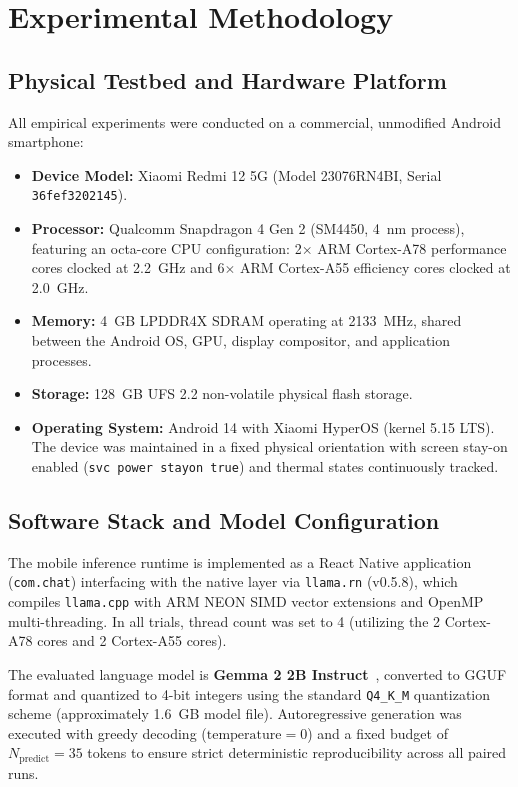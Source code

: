 \section{Experimental Methodology}
\label{sec:methodology}

\subsection{Physical Testbed and Hardware Platform}
All empirical experiments were conducted on a commercial, unmodified Android smartphone:
\begin{itemize}
    \item \textbf{Device Model:} Xiaomi Redmi 12 5G (Model 23076RN4BI, Serial \texttt{36fef3202145}).
    \item \textbf{Processor:} Qualcomm Snapdragon 4 Gen 2 (SM4450, 4~nm process), featuring an octa-core CPU configuration: 2$\times$ ARM Cortex-A78 performance cores clocked at 2.2~GHz and 6$\times$ ARM Cortex-A55 efficiency cores clocked at 2.0~GHz.
    \item \textbf{Memory:} 4~GB LPDDR4X SDRAM operating at 2133~MHz, shared between the Android OS, GPU, display compositor, and application processes.
    \item \textbf{Storage:} 128~GB UFS 2.2 non-volatile physical flash storage.
    \item \textbf{Operating System:} Android 14 with Xiaomi HyperOS (kernel 5.15 LTS). The device was maintained in a fixed physical orientation with screen stay-on enabled (\texttt{svc power stayon true}) and thermal states continuously tracked.
\end{itemize}

\subsection{Software Stack and Model Configuration}
The mobile inference runtime is implemented as a React Native application (\texttt{com.chat}) interfacing with the native layer via \texttt{llama.rn} (v0.5.8), which compiles \texttt{llama.cpp} with ARM NEON SIMD vector extensions and OpenMP multi-threading. In all trials, thread count was set to 4 (utilizing the 2 Cortex-A78 cores and 2 Cortex-A55 cores).

The evaluated language model is \textbf{Gemma 2 2B Instruct}~\cite{gemma2024gemma2}, converted to GGUF format and quantized to 4-bit integers using the standard \texttt{Q4\_K\_M} quantization scheme (approximately 1.6~GB model file). Autoregressive generation was executed with greedy decoding ($\text{temperature} = 0$) and a fixed budget of $N_{\text{predict}} = 35$ tokens to ensure strict deterministic reproducibility across all paired runs.

